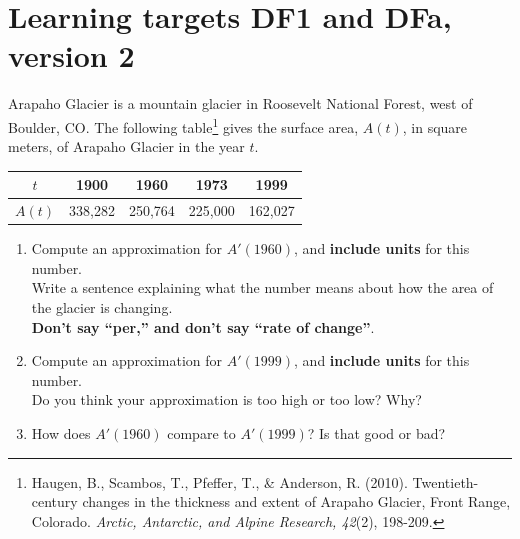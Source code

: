 
\usepackage{pgfplots}


%


\allowdisplaybreaks
\section{Learning targets DF1 and DFa, version 2}

Arapaho Glacier is a mountain glacier in Roosevelt National Forest,
west of Boulder, CO. The following table\footnote{
Haugen, B., Scambos, T., Pfeffer, T., \& Anderson, R. (2010). Twentieth-century changes in the thickness and extent of Arapaho Glacier, Front Range, Colorado. \textit{Arctic, Antarctic, and Alpine Research, 42}(2), 198-209.}
gives the surface area, $A(t)$, in square meters, of Arapaho Glacier in the year $t$. 
\begin{center}
	\begin{tabular}{|c|c|c|c|c|}
	\hline
	$t$ & 1900 & 1960 & 1973 & 1999\\
	\hline
	$A(t)$ & 338,282 & 250,764 & 225,000 & 162,027\\
	\hline
	\end{tabular}
 \end{center}
	
\begin{enumerate}[leftmargin=0pt]

\item Compute an approximation for $A'(1960)$, and {\bf include units} for this number.\\
Write a sentence explaining what the number means about how the area of the glacier is changing.\\
\textbf{Don't say ``per,'' and don't say ``rate of change''}. 

\vfill
\vfill

\item Compute an approximation for $A'(1999)$, and {\bf include units} for this number.\\
Do you think your approximation is too high or too low? Why?

\vfill
\vfill

\item How does $A'(1960)$ compare to $A'(1999)$? Is that good or bad?
\vfill
\end{enumerate}

\pagebreak

